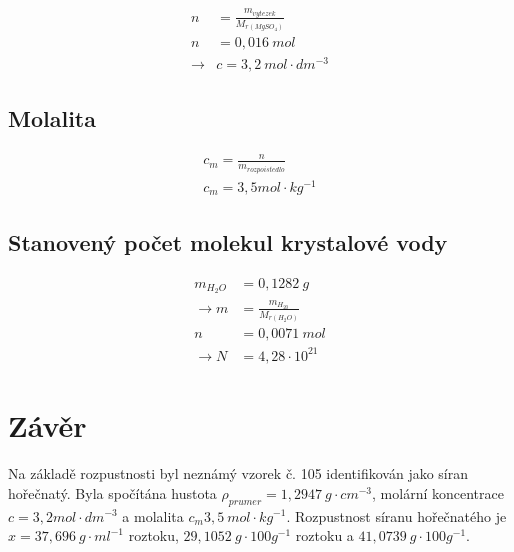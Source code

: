 \documentclass[13pt, a4paper, twoside]{article}
\begin{document}
\begin{align*}
    n&= \frac{m_{vytezek}}{M_{r(MgSO_4)}}\\
    n&= 0,016 \:mol\\
    \to &c=3,2 \: mol \cdot dm^{-3}
\end{align*}

\subsection*{Molalita}
\begin{align*}
    c_m = \frac{n}{m_{rozpoistedlo}}\\
    c_m = 3,5 mol \cdot kg^{-1}
\end{align*}

\subsection*{Stanovený počet molekul krystalové vody}
\begin{align*}
    m_{H_2O} &= 0,1282\: g\\
    \to m &= \frac{m_{H_20}}{M_{r(H_2O)}}\\
    n &= 0,0071\: mol \\
    \to N &= 4,28 \cdot 10^{21}
\end{align*}

\section*{Závěr}
Na základě rozpustnosti byl neznámý vzorek č. 105 identifikován jako síran hořečnatý. Byla spočítána hustota
$\rho_{prumer}=1,2947 \: g \cdot cm^{-3}$, molární koncentrace $c=3,2 mol \cdot dm^{-3}$
a molalita $c_m3,5 \: mol \cdot kg^{-1}$. Rozpustnost síranu hořečnatého je
$x=37,696 \: g \cdot ml^{-1}$ roztoku, $29,1052\: g \cdot 100 g^{-1}$ roztoku
a $41,0739\: g \cdot 100g^{-1}$.
\end{document}
